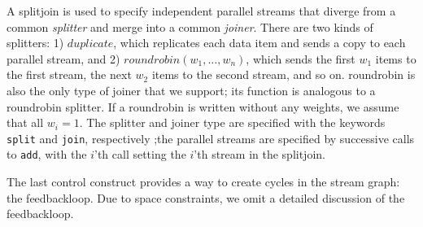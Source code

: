 A splitjoin is used to specify independent parallel streams that
diverge from a common {\it splitter} and merge into a common {\it
joiner}.  There are two kinds of splitters: 1) $duplicate$, which
replicates each data item and sends a copy to each parallel stream,
and 2) $roundrobin(w_1, \dots, w_n)$, which sends the first $w_1$
items to the first stream, the next $w_2$ items to the second stream,
and so on.  roundrobin is also the only type of joiner that we
support; its function is analogous to a roundrobin splitter.  If a
roundrobin is written without any weights, we assume that all $w_i =
1$.  The splitter and joiner type are specified with the keywords {\tt
split} and {\tt join}, respectively 
;the parallel streams are specified by successive calls to {\tt add},
with the $i$'th call setting the $i$'th stream in the splitjoin.

The last control construct provides a way to create cycles in the
stream graph: the feedbackloop.  Due to space constraints, we omit a
detailed discussion of the feedbackloop.